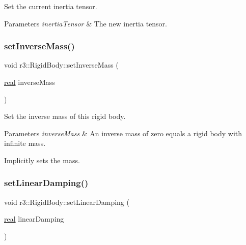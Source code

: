 Set the current inertia tensor. 


\begin{DoxyParams}{Parameters}
{\em inertia\+Tensor} & The new inertia tensor. \\
\hline
\end{DoxyParams}
\mbox{\label{classr3_1_1_rigid_body_a28ee9e1542663a4e704077e9327ddece}} 
\subsubsection{\texorpdfstring{set\+Inverse\+Mass()}{setInverseMass()}}
{\footnotesize\ttfamily void r3\+::\+Rigid\+Body\+::set\+Inverse\+Mass (\begin{DoxyParamCaption}\item[{\mbox{\hyperlink{namespacer3_ab2016b3e3f743fb735afce242f0dc1eb}{real}}}]{inverse\+Mass }\end{DoxyParamCaption})}



Set the inverse mass of this rigid body. 


\begin{DoxyParams}{Parameters}
{\em inverse\+Mass} & An inverse mass of zero equals a rigid body with infinite mass.\\
\hline
\end{DoxyParams}
Implicitly sets the mass. \mbox{\label{classr3_1_1_rigid_body_ac65bfd9fd7a12de59141fab3c02e8579}} 
\subsubsection{\texorpdfstring{set\+Linear\+Damping()}{setLinearDamping()}}
{\footnotesize\ttfamily void r3\+::\+Rigid\+Body\+::set\+Linear\+Damping (\begin{DoxyParamCaption}\item[{\mbox{\hyperlink{namespacer3_ab2016b3e3f743fb735afce242f0dc1eb}{real}}}]{linear\+Damping }\end{DoxyParamCaption})}



